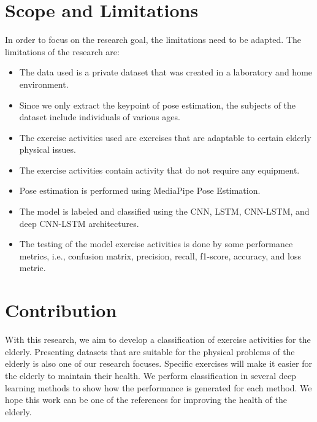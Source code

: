 \section{Scope and Limitations}
In order to focus on the research goal, the limitations need to be adapted. The limitations of the research are:
\begin{itemize}
	\item The data used is a private dataset that was created in a laboratory and home environment.
	\item Since we only extract the keypoint of pose estimation, the subjects of the dataset include individuals of various ages.
	\item The exercise activities used are exercises that are adaptable to certain elderly physical issues.
	\item The exercise activities contain activity that do not require any equipment.
	\item Pose estimation is performed using MediaPipe Pose Estimation.
	\item The model is labeled and classified using the CNN, LSTM, CNN-LSTM, and deep CNN-LSTM architectures.
	\item The testing of the model exercise activities is done by some performance metrics, i.e., confusion matrix, precision, recall, f1-score, accuracy, and loss metric.
\end{itemize}


\section{Contribution}
With this research, we aim to develop a classification of exercise activities for the elderly. Presenting datasets that are suitable for the physical problems of the elderly is also one of our research focuses. Specific exercises will make it easier for the elderly to maintain their health. We perform classification in several deep learning methods to show how the performance is generated for each method. We hope this work can be one of the references for improving the health of the elderly.

